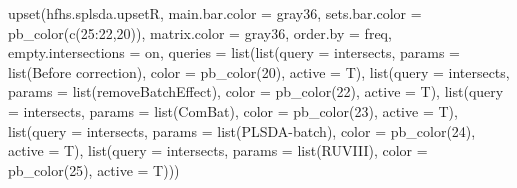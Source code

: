 \documentclass[
]{book}
\newenvironment{Shaded}{\begin{snugshade}}{\end{snugshade}}
\newcommand{\AttributeTok}[1]{\textcolor[rgb]{0.77,0.63,0.00}{#1}}
\newcommand{\DecValTok}[1]{\textcolor[rgb]{0.00,0.00,0.81}{#1}}
\newcommand{\FunctionTok}[1]{\textcolor[rgb]{0.00,0.00,0.00}{#1}}
\newcommand{\NormalTok}[1]{#1}
\newcommand{\SpecialCharTok}[1]{\textcolor[rgb]{0.00,0.00,0.00}{#1}}
\newcommand{\StringTok}[1]{\textcolor[rgb]{0.31,0.60,0.02}{#1}}
\begin{document}
\begin{Shaded}
\begin{Highlighting}[]
\FunctionTok{upset}\NormalTok{(hfhs.splsda.upsetR, }\AttributeTok{main.bar.color =} \StringTok{\textquotesingle{}gray36\textquotesingle{}}\NormalTok{,}
      \AttributeTok{sets.bar.color =} \FunctionTok{pb\_color}\NormalTok{(}\FunctionTok{c}\NormalTok{(}\DecValTok{25}\SpecialCharTok{:}\DecValTok{22}\NormalTok{,}\DecValTok{20}\NormalTok{)), }\AttributeTok{matrix.color =} \StringTok{\textquotesingle{}gray36\textquotesingle{}}\NormalTok{,}
      \AttributeTok{order.by =} \StringTok{\textquotesingle{}freq\textquotesingle{}}\NormalTok{, }\AttributeTok{empty.intersections =} \StringTok{\textquotesingle{}on\textquotesingle{}}\NormalTok{,}
      \AttributeTok{queries =} 
        \FunctionTok{list}\NormalTok{(}\FunctionTok{list}\NormalTok{(}\AttributeTok{query =}\NormalTok{ intersects, }\AttributeTok{params =} \FunctionTok{list}\NormalTok{(}\StringTok{\textquotesingle{}Before correction\textquotesingle{}}\NormalTok{), }
                  \AttributeTok{color =} \FunctionTok{pb\_color}\NormalTok{(}\DecValTok{20}\NormalTok{), }\AttributeTok{active =}\NormalTok{ T),}
             \FunctionTok{list}\NormalTok{(}\AttributeTok{query =}\NormalTok{ intersects, }\AttributeTok{params =} \FunctionTok{list}\NormalTok{(}\StringTok{\textquotesingle{}removeBatchEffect\textquotesingle{}}\NormalTok{), }
                  \AttributeTok{color =} \FunctionTok{pb\_color}\NormalTok{(}\DecValTok{22}\NormalTok{), }\AttributeTok{active =}\NormalTok{ T),}
             \FunctionTok{list}\NormalTok{(}\AttributeTok{query =}\NormalTok{ intersects, }\AttributeTok{params =} \FunctionTok{list}\NormalTok{(}\StringTok{\textquotesingle{}ComBat\textquotesingle{}}\NormalTok{), }
                  \AttributeTok{color =} \FunctionTok{pb\_color}\NormalTok{(}\DecValTok{23}\NormalTok{), }\AttributeTok{active =}\NormalTok{ T),}
             \FunctionTok{list}\NormalTok{(}\AttributeTok{query =}\NormalTok{ intersects, }\AttributeTok{params =} \FunctionTok{list}\NormalTok{(}\StringTok{\textquotesingle{}PLSDA{-}batch\textquotesingle{}}\NormalTok{), }
                  \AttributeTok{color =} \FunctionTok{pb\_color}\NormalTok{(}\DecValTok{24}\NormalTok{), }\AttributeTok{active =}\NormalTok{ T),}
             \FunctionTok{list}\NormalTok{(}\AttributeTok{query =}\NormalTok{ intersects, }\AttributeTok{params =} \FunctionTok{list}\NormalTok{(}\StringTok{\textquotesingle{}RUVIII\textquotesingle{}}\NormalTok{), }
                  \AttributeTok{color =} \FunctionTok{pb\_color}\NormalTok{(}\DecValTok{25}\NormalTok{), }\AttributeTok{active =}\NormalTok{ T)))}
\end{Highlighting}
\end{Shaded}
\end{document}
